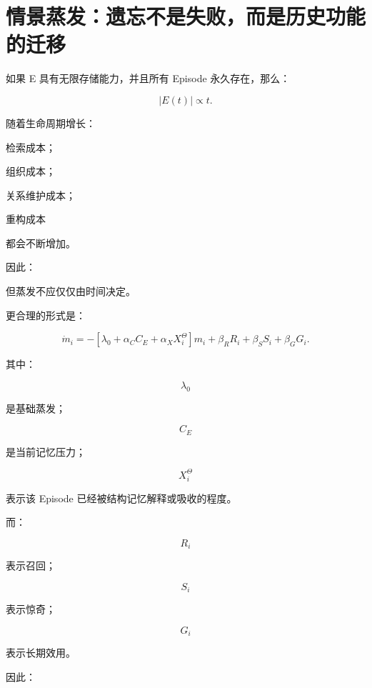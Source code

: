 \section{情景蒸发：遗忘不是失败，而是历史功能的迁移}

如果 E 具有无限存储能力，并且所有 Episode 永久存在，那么：

\[
|E(t)|
\propto
t.
\]

随着生命周期增长：

检索成本；

组织成本；

关系维护成本；

重构成本

都会不断增加。

因此：

\begin{statementbox}
\centering
{}
\end{statementbox}

但蒸发不应仅仅由时间决定。

更合理的形式是：

\[
\boxed{
\dot m_i
=
-
\left[
\lambda_0
+
\alpha_C C_E
+
\alpha_X X_i^\Theta
\right]m_i
+
\beta_RR_i
+
\beta_SS_i
+
\beta_GG_i.
}
\]

其中：

\[
\lambda_0
\]

是基础蒸发；

\[
C_E
\]

是当前记忆压力；

\[
X_i^\Theta
\]

表示该 Episode 已经被结构记忆解释或吸收的程度。

而：

\[
R_i
\]

表示召回；

\[
S_i
\]

表示惊奇；

\[
G_i
\]

表示长期效用。

因此：

\begin{statementbox}
\centering
{}
\end{statementbox}

\begin{statementbox}
\centering
{}
\end{statementbox}

